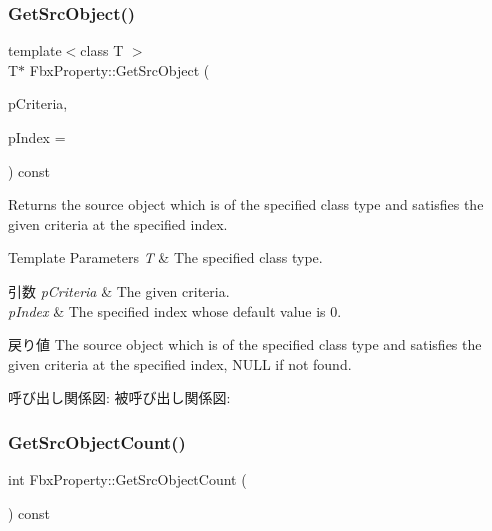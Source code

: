 \subsubsection{\texorpdfstring{Get\+Src\+Object()}{GetSrcObject()}\hspace{0.1cm}{\footnotesize\ttfamily [4/4]}}
{\footnotesize\ttfamily template$<$class T $>$ \\
T$\ast$ Fbx\+Property\+::\+Get\+Src\+Object (\begin{DoxyParamCaption}\item[{const \hyperlink{class_fbx_criteria}{Fbx\+Criteria} \&}]{p\+Criteria,  }\item[{const int}]{p\+Index = {} }\end{DoxyParamCaption}) const}

Returns the source object which is of the specified class type and satisfies the given criteria at the specified index. 
\begin{DoxyTemplParams}{Template Parameters}
{\em T} & The specified class type. \\
\hline
\end{DoxyTemplParams}

\begin{DoxyParams}{引数}
{\em p\+Criteria} & The given criteria. \\
\hline
{\em p\+Index} & The specified index whose default value is 0. \\
\hline
\end{DoxyParams}
\begin{DoxyReturn}{戻り値}
The source object which is of the specified class type and satisfies the given criteria at the specified index, N\+U\+LL if not found. 
\end{DoxyReturn}
呼び出し関係図\+:
被呼び出し関係図\+:
\mbox{\label{class_fbx_property_a4b6d431d87134722800f06e4cb442335}} 
\subsubsection{\texorpdfstring{Get\+Src\+Object\+Count()}{GetSrcObjectCount()}\hspace{0.1cm}{\footnotesize\ttfamily [1/4]}}
{\footnotesize\ttfamily int Fbx\+Property\+::\+Get\+Src\+Object\+Count (\begin{DoxyParamCaption}{ }\end{DoxyParamCaption}) const}

